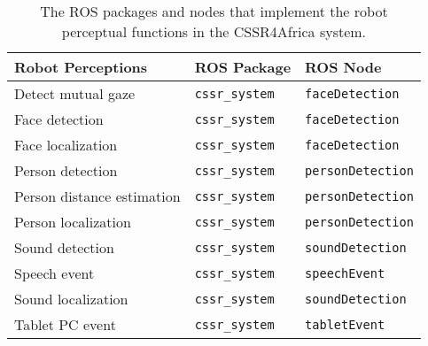 \documentclass{CSSRforAfrica}
\begin{document}
\begin{table}[thb]
\begin{center}
\begin{tabular}{|l l l|}
\hline 
Robot Perceptions                                                    & ROS Package                                                  &  ROS Node       \\
\hline
{\small Detect mutual gaze }	           & {\small \verb+cssr_system+}                      & {\small \verb+faceDetection+} \\
{\small Face detection }                      & {\small \verb+cssr_system+}                      & {\small \verb+faceDetection+}  \\
{\small Face localization }                   & {\small \verb+cssr_system+}                       &  {\small \verb+faceDetection+}  \\
{\small Person detection }                   & {\small \verb+cssr_system+}                      & {\small \verb+personDetection+}  \\
{\small Person distance estimation }    & {\small \verb+cssr_system+}                      & {\small \verb+personDetection+}  \\
{\small Person localization  }               & {\small \verb+cssr_system+}                      &  {\small \verb+personDetection+}  \\
{\small Sound detection  }                    & {\small \verb+cssr_system+}                     & {\small \verb+soundDetection+}  \\
{\small Speech event}                          &  {\small \verb+cssr_system+}    		& {\small \verb+speechEvent+} \\
{\small Sound localization}                 &  {\small \verb+cssr_system+}                     & {\small \verb+soundDetection+} \\
{\small Tablet PC event}                      &  {\small \verb+cssr_system+}    		& {\small \verb+tabletEvent+} \\
\hline
\end{tabular}
\end{center}
\caption{The ROS packages and nodes that implement the robot perceptual functions in the CSSR4Africa  system.}
\label{table:nodes}
\end{table}
 

\begin{comment}
\section{ROS Perception Node Specifications}

\label{section:perception_nodes} 

\subsection{}
\end{comment}
\end{document}

